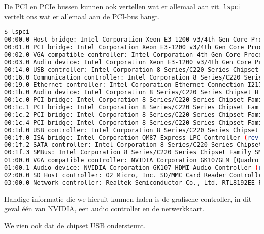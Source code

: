 De PCI en PCIe bussen kunnen ook vertellen wat er allemaal aan zit. \texttt{lspci} vertelt ons wat er allemaal aan de PCI-bus hangt.

\begin{lstlisting}[language=bash]
$ lspci
00:00.0 Host bridge: Intel Corporation Xeon E3-1200 v3/4th Gen Core Processor DRAM Controller (rev 06)
00:01.0 PCI bridge: Intel Corporation Xeon E3-1200 v3/4th Gen Core Processor PCI Express x16 Controller (rev 06)
00:02.0 VGA compatible controller: Intel Corporation 4th Gen Core Processor Integrated Graphics Controller (rev 06)
00:03.0 Audio device: Intel Corporation Xeon E3-1200 v3/4th Gen Core Processor HD Audio Controller (rev 06)
00:14.0 USB controller: Intel Corporation 8 Series/C220 Series Chipset Family USB xHCI (rev 04)
00:16.0 Communication controller: Intel Corporation 8 Series/C220 Series Chipset Family MEI Controller #1 (rev 04)
00:19.0 Ethernet controller: Intel Corporation Ethernet Connection I217-LM (rev 04)
00:1b.0 Audio device: Intel Corporation 8 Series/C220 Series Chipset High Definition Audio Controller (rev 04)
00:1c.0 PCI bridge: Intel Corporation 8 Series/C220 Series Chipset Family PCI Express Root Port #1 (rev d4)
00:1c.1 PCI bridge: Intel Corporation 8 Series/C220 Series Chipset Family PCI Express Root Port #2 (rev d4)
00:1c.2 PCI bridge: Intel Corporation 8 Series/C220 Series Chipset Family PCI Express Root Port #3 (rev d4)
00:1c.4 PCI bridge: Intel Corporation 8 Series/C220 Series Chipset Family PCI Express Root Port #5 (rev d4)
00:1d.0 USB controller: Intel Corporation 8 Series/C220 Series Chipset Family USB EHCI #1 (rev 04)
00:1f.0 ISA bridge: Intel Corporation QM87 Express LPC Controller (rev 04)
00:1f.2 SATA controller: Intel Corporation 8 Series/C220 Series Chipset Family 6-port SATA Controller 1 [AHCI mode] (rev 04)
00:1f.3 SMBus: Intel Corporation 8 Series/C220 Series Chipset Family SMBus Controller (rev 04)
01:00.0 VGA compatible controller: NVIDIA Corporation GK107GLM [Quadro K1100M] (rev a1)
01:00.1 Audio device: NVIDIA Corporation GK107 HDMI Audio Controller (rev a1)
02:00.0 SD Host controller: O2 Micro, Inc. SD/MMC Card Reader Controller (rev 01)
03:00.0 Network controller: Realtek Semiconductor Co., Ltd. RTL8192EE PCIe Wireless Network Adapter
\end{lstlisting}
Handige informatie die we hieruit kunnen halen is de grafische controller, in dit geval \'e\'en van NVIDIA, een audio controller en de netwerkkaart.

We zien ook dat de chipset USB ondersteunt.
